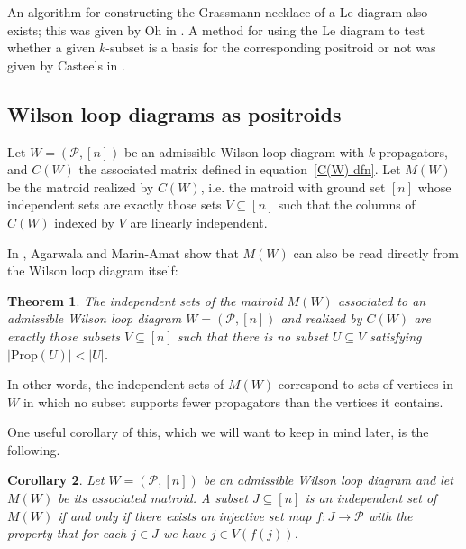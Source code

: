 \documentclass[11pt]{article}
\newcommand{\cP}{\mathcal{P}}
\newcommand{\Prop}{\textrm{Prop}}
\newtheorem{thm}{Theorem}[section]
\newtheorem{cor}[thm]{Corollary}
\theoremstyle{remark}
\theoremstyle{definition}
\begin{document}
An algorithm for constructing the Grassmann necklace of a Le diagram also exists; this was given by Oh in \cite[section 4]{Oh}. A method for using the Le diagram to test whether a given $k$-subset is a basis for the corresponding positroid or not was given by Casteels in \cite{CasteelsPaths}.



\subsection{Wilson loop diagrams as positroids}\label{sec:WLD as positroids}


Let $W = (\cP,[n])$ be an admissible Wilson loop diagram with $k$ propagators, and $C(W)$ the associated matrix defined in equation~\eqref{C(W) dfn}. Let $M(W)$ be the matroid realized by $C(W)$, i.e. the matroid with ground set $[n]$ whose independent sets are exactly those sets $V \subseteq [n]$ such that the columns of $C(W)$ indexed by $V$ are linearly independent.

In \cite{wilsonloop}, Agarwala and Marin-Amat show that $M(W)$ can also be read directly from the Wilson loop diagram itself:

\begin{thm} \label{thm WLD defines matroid} \cite[Theorem 3.6]{wilsonloop} The independent sets of the matroid $M(W)$ associated to an admissible Wilson loop diagram $W = (\cP,[n])$ and realized by $C(W)$ are exactly those subsets $V \subseteq [n]$ such that there is no subset $U \subseteq V$ satisfying $|\Prop(U)| < |U|$. \end{thm}
In other words, the independent sets of $M(W)$ correspond to sets of vertices in $W$ in which no subset supports fewer propagators than the vertices it contains.

One useful corollary of this, which we will want to keep in mind later, is the following.
\begin{cor}\label{lem basis as perm}
Let $W = (\cP,[n])$ be an admissible Wilson loop diagram and let $M(W)$ be its associated matroid. A subset $J \subseteq [n]$ is an independent set of $M(W)$ if and only if there exists an injective set map $f : J \rightarrow \cP$ with the property that for each $j\in J$ we have $j \in V(f(j))$.
\end{cor}
\end{document}
